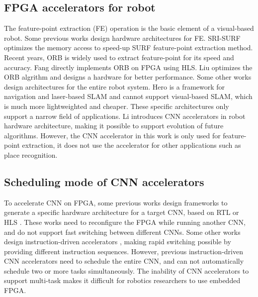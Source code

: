 \subsection{ FPGA accelerators for robot }

The feature-point extraction (FE) operation is the basic element of a visual-based robot.
Some previous works design hardware architectures for FE.
SRI-SURF \cite{jia2016sri} optimizes the memory access to speed-up SURF \cite{bay2006surf} feature-point extraction method. Recent years, ORB is widely used to extract feature-point for its speed and accuracy. 
Fang \cite{fang2017fpga} directly implements ORB on FPGA using HLS. Liu \cite{liu2019eslam} optimizes the ORB algrithm and designs a hardware for better performance.
Some other works design architectures for the entire robot system. Hero \cite{shi2018hero} is a framework for navigation and laser-based SLAM and cannot support visual-based SLAM, which is much more lightweighted and cheaper. These specific architectures only support a narrow field of applications. 
Li \cite{li2019879gops} introduces CNN accelerators in robot hardware architecture, making it possible to support evolution of future algorithms. However, the CNN accelerator in this work is only used for feature-point extraction, it does not use the accelerator for other applications such as place recognition.



\subsection{ Scheduling mode of CNN accelerators }

To accelerate CNN on FPGA, some previous works design frameworks to generate a specific hardware architecture for a target CNN, based on  RTL \cite{li_high_2016} or HLS \cite{lu_evaluating_2017}. These works need to reconfigure the FPGA while running another CNN, and do not support fast switching between different CNNs. Some other works design instruction-driven accelerators \cite{yu2018instruction,qiu2016going}, making rapid switching possible by providing different instruction sequences. However, previous instruction-driven CNN accelerators need to schedule the entire CNN, and can not automatically schedule two or more tasks simultaneously. The inability of CNN accelerators to support multi-task makes it difficult for robotics researchers to use embedded FPGA.